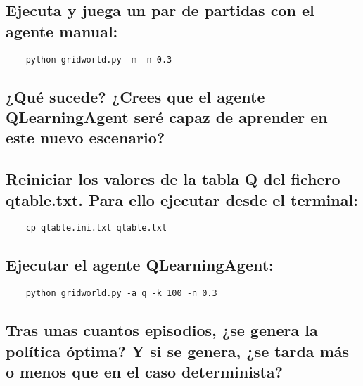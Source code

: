 \documentclass[12pt]{article}
\begin{document}
    \subsection{Ejecuta y juega un par de partidas con el agente manual:}
    \begin{verbatim}
    python gridworld.py -m -n 0.3
    \end{verbatim}
    \subsection*{¿Qué sucede? ¿Crees que el agente QLearningAgent seré capaz de aprender en este nuevo escenario?}
    \subsection{Reiniciar los valores de la tabla Q del fichero qtable.txt. Para ello ejecutar desde el terminal:}
    \begin{verbatim}
    cp qtable.ini.txt qtable.txt
    \end{verbatim}
    \subsection{Ejecutar el agente QLearningAgent:}
    \begin{verbatim}
    python gridworld.py -a q -k 100 -n 0.3
    \end{verbatim}
    \subsection{Tras unas cuantos episodios, ¿se genera la política óptima? Y si se genera, ¿se tarda más o menos
    que en el caso determinista?}
\end{document}
